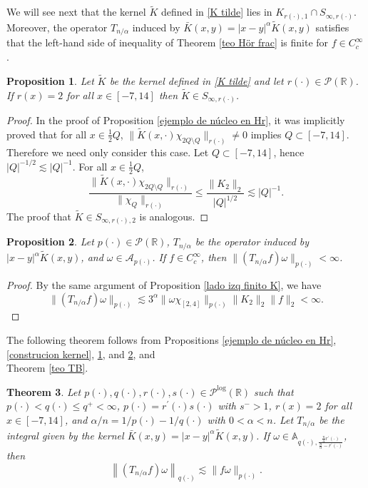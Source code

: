 \documentclass[a4paper,11pt,reqno]{amsart}
\theoremstyle{plain}
\numberwithin{equation}{section}
\newtheorem{teo}{Theorem}[section]
\newtheorem{propo}[teo]{Proposition}
\theoremstyle{definition}
\begin{document}
We will see next that the kernel $\tilde{K}$ defined in \eqref{K tilde} lies in $K_{r(\cdot),1}\cap S_{\infty,r(\cdot)}$. Moreover, the operator $T_{n/\alpha}$ induced by $\bar{K}(x,y)=|x-y|^\alpha\tilde{K}(x,y)$ satisfies that the left-hand side of inequality of Theorem \ref{teo Hör frac} is finite for $f\in C_c^\infty$.

\begin{propo}\label{k tilde en s infinito}
	Let $\tilde{K}$ be the kernel defined in \eqref{K tilde} and let $r(\cdot)\in\mathcal{P}(\mathbb{R})$. If $r(x)=2$ for all $x\in[-7,14]$ then $\tilde{K}\in S_{\infty,r(\cdot)}$.
\end{propo}
\begin{proof}
	In the proof of Proposition \ref{ejemplo de núcleo en Hr}, it was implicitly proved that for all $x\in \frac{1}{2}Q$, $\|\tilde{K}(x,\cdot)\chi_{2Q\setminus Q}\|_{r(\cdot)}\neq0$ implies $Q\subset [-7,14]$. Therefore we need only consider this case. Let $Q\subset[-7,14]$, hence $|Q|^{-1/2}\lesssim|Q|^{-1}$. For all $x\in\frac{1}{2}Q$, 
	\begin{equation*}
	\frac{\|\tilde{K}(x,\cdot)\chi_{2Q\setminus Q}\|_{r(\cdot)}}{\|\chi_Q\|_{r(\cdot)}}\leq\frac{\|K_2\|_2}{|Q|^{1/2}}\lesssim |Q|^{-1}.
	\end{equation*}
	The proof that $\tilde{K}\in S_{\infty,r(\cdot),2}$ is analogous.
\end{proof}

\begin{propo}\label{lado izq finito K alpha}
	Let $p(\cdot)\in \mathcal{P}(\mathbb{R})$, $T_{n/\alpha}$ be the operator induced by $|x-y|^\alpha\tilde{K}(x,y)$, and $\omega\in \mathcal{A}_{p(\cdot)}$. If $f\in C^\infty_c$, then $\|(T_{n/\alpha}f)\omega\|_{p(\cdot)}<\infty$.
\end{propo}

\begin{proof}
	By the same argument of Proposition \ref{lado izq finito K}, we have
	\begin{equation*}
	\|(T_{n/\alpha}f)\omega\|_{p(\cdot)}\lesssim3^\alpha\|\omega\chi_{[2,4]}\|_{p(\cdot)}\|K_2\|_2\|f\|_2<\infty.
	\end{equation*}
\end{proof}
 The following theorem follows from Propositions \ref{ejemplo de núcleo en Hr}, \ref{construcion kernel}, \ref{k tilde en s infinito}, and \ref{lado izq finito K alpha}, and \\Theorem \ref{teo TB}.
\begin{teo}
	Let $p(\cdot),q(\cdot),r(\cdot),s(\cdot)\in\mathcal{P}^{\log}(\mathbb{R})$ such that $p(\cdot)<q(\cdot)\leq q^+<\infty$, $p(\cdot)=r^\prime(\cdot)s(\cdot)$ with $s^->1$, $r(x)=2$ for all $x\in[-7,14]$, and $\alpha/n=1/p(\cdot)-1/q(\cdot)$ with $0<\alpha<n$. Let $T_{n/\alpha}$ be the integral given by the kernel $\bar{K}(x,y)=|x-y|^\alpha\tilde{K}(x,y)$. If $\omega\in \mathbb{A}_{q(\cdot),\frac{\frac{n}{\alpha} r^\prime(\cdot)}{\frac{n}{\alpha}-r^\prime(\cdot)}}$, then 
	$$\left\|\left(T_{n/\alpha}f\right)\omega\right\|_{q(\cdot)}\lesssim\|f\omega\|_{p(\cdot)}.$$
\end{teo}
\end{document}
